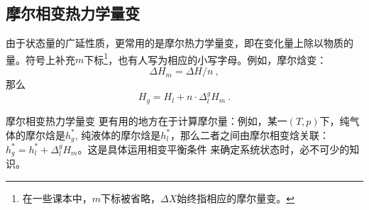 \subsection{摩尔相变热力学量变}
由于状态量的广延性质，更常用的是摩尔热力学量变，即在变化量上除以物质的量。符号上补充$m$下标\footnote{在一些课本中，$m$下标被省略，$\Delta X$始终指相应的摩尔量变。}，也有人写为相应的小写字母。例如，摩尔焓变：
$$
\Delta H_m = \Delta H / n~,
$$
那么
$$
H_g = H_l + n \cdot \Delta^g_l H_m~.
$$

摩尔相变热力学量变 更有用的地方在于计算摩尔量：例如，某一$(T,p)$下，纯气体的摩尔焓是$h^*_g$, 纯液体的摩尔焓是$h^*_l$，那么二者之间由摩尔相变焓关联：$h^*_g = h^*_l + \Delta^g_l H_m$。这是具体运用相变平衡条件 来确定系统状态时，必不可少的知识。

